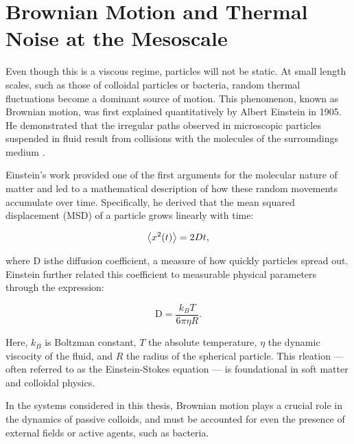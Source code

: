 \section{Brownian Motion and Thermal Noise at the Mesoscale}
Even though this is a viscous regime, particles will not be static. At small length scales, such as those of colloidal particles or bacteria, random thermal fluctuations become a dominant source of motion. This phenomenon, known as Brownian motion, was first explained quantitatively by Albert Einstein in 1905. He demonstrated that the irregular paths observed in microscopic particles suspended in fluid result from collisions with the molecules of the surroundings medium \cite{einstein1906theory}.

Einstein's work provided one of the first arguments for the molecular nature of matter and led to a mathematical description of how these random movements accumulate over time. Specifically, he derived that the mean squared displacement (MSD) of a particle grows linearly with time:

\begin{equation}
  \expval{x^2(t)} = 2Dt\text{,}
  \label{eq:msd}
\end{equation}

where D isthe diffusion coefficient, a measure of how quickly particles spread out. Einstein further related this coefficient to measurable physical parameters through the expression:

\begin{equation}
  \text{D} = \frac{k_{B}T}{6\pi \eta R}\text{.} 
  \label{eq:diffusioncoefficient}
\end{equation}

Here, $k_B$ is Boltzman constant, $T$ the absolute temperature, $\eta$ the dynamic viscocity of the fluid, and $R$ the radius of the spherical particle. This rleation — often referred to as the Einstein-Stokes equation — is foundational in soft matter and colloidal physics.

In the systems considered in this thesis, Brownian motion plays a crucial role in the dynamics of passive colloids, and must be accounted for even the presence of external fields or active agents, such as bacteria.




\newpage
